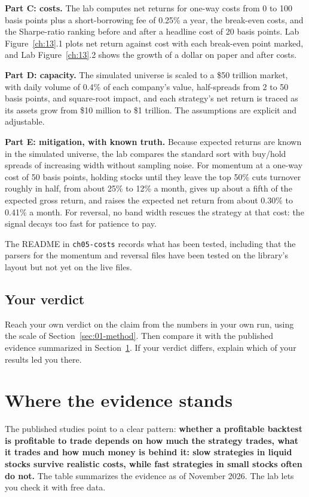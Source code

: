 \textbf{Part C: costs.} The lab computes net returns for one-way costs from 0 to 100 basis points plus a short-borrowing fee of 0.25\% a year, the break-even costs, and the Sharpe-ratio ranking before and after a headline cost of 20 basis points. Lab Figure~\ref{ch:13}.1 plots net return against cost with each break-even point marked, and Lab Figure~\ref{ch:13}.2 shows the growth of a dollar on paper and after costs.

\textbf{Part D: capacity.} The simulated universe is scaled to a \$50 trillion market, with daily volume of 0.4\% of each company's value, half-spreads from 2 to 50 basis points, and square-root impact, and each strategy's net return is traced as its assets grow from \$10 million to \$1 trillion. The assumptions are explicit and adjustable.

\textbf{Part E: mitigation, with known truth.} Because expected returns are known in the simulated universe, the lab compares the standard sort with buy/hold spreads of increasing width without sampling noise. For momentum at a one-way cost of 50 basis points, holding stocks until they leave the top 50\% cuts turnover roughly in half, from about 25\% to 12\% a month, gives up about a fifth of the expected gross return, and raises the expected net return from about 0.30\% to 0.41\% a month. For reversal, no band width rescues the strategy at that cost: the signal decays too fast for patience to pay.

The README in \texttt{ch05-costs} records what has been tested, including that the parsers for the momentum and reversal files have been tested on the library's layout but not yet on the live files.

\subsection*{Your verdict}

Reach your own verdict on the claim from the numbers in your own run, using the scale of Section~\ref{sec:01-method}. Then compare it with the published evidence summarized in Section~\ref{sec:17-verdict}. If your verdict differs, explain which of your results led you there.

\section{Where the evidence stands}
\label{sec:17-verdict}

The published studies point to a clear pattern: \textbf{whether a profitable backtest is profitable to trade depends on how much the strategy trades, what it trades and how much money is behind it: slow strategies in liquid stocks survive realistic costs, while fast strategies in small stocks often do not.} The table summarizes the evidence as of November 2026. The lab lets you check it with free data.

